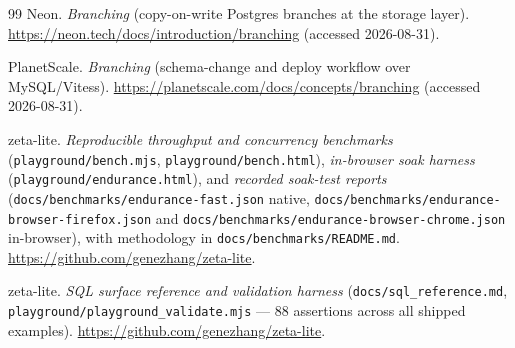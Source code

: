 \documentclass[11pt]{article}
\begin{document}
\begin{thebibliography}{99}
 Neon. \emph{Branching} (copy-on-write Postgres branches at the storage
layer). \url{https://neon.tech/docs/introduction/branching} (accessed 2026-08-31).

 PlanetScale. \emph{Branching} (schema-change and deploy
workflow over MySQL/Vitess). \url{https://planetscale.com/docs/concepts/branching}
(accessed 2026-08-31).

 zeta-lite. \emph{Reproducible throughput and concurrency
benchmarks} (\texttt{playground/bench.mjs}, \texttt{playground/bench.html}),
\emph{in-browser soak harness} (\texttt{playground/endurance.html}), and
\emph{recorded soak-test reports} (\texttt{docs/benchmarks/endurance-fast.json}
native, \texttt{docs/benchmarks/endurance-browser-firefox.json} and
\texttt{docs/benchmarks/endurance-browser-chrome.json} in-browser), with methodology
in \texttt{docs/benchmarks/README.md}. \url{https://github.com/genezhang/zeta-lite}.

 zeta-lite. \emph{SQL surface reference and validation harness}
(\texttt{docs/sql\_reference.md}, \texttt{playground/playground\_validate.mjs} --- 88
assertions across all shipped examples).
\url{https://github.com/genezhang/zeta-lite}.

\end{thebibliography}
\end{document}
